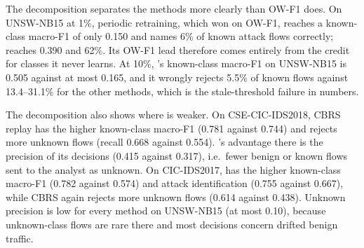 \begin{table}[t]
\centering
\caption{Open-world outcomes separated (mean over five seeds). Known: flows of classes the deployed model knows;
unknown: flows of classes it does not know.}
\label{tab:decomp}
\small
\setlength{\tabcolsep}{4pt}
%
%
\end{table}

The decomposition separates the methods more clearly than OW-F1 does. On UNSW-NB15 at 1\%, periodic retraining,
which won on OW-F1, reaches a known-class macro-F1 of only 0.150 and names 6\% of known attack flows correctly;
\nova{} reaches 0.390 and 62\%. Its OW-F1 lead therefore comes entirely from the \unk{} credit for classes it
never learns. At 10\%, \nova{}'s known-class macro-F1 on UNSW-NB15 is 0.505 against at most 0.165, and it wrongly
rejects 5.5\% of known flows against 13.4--31.1\% for the other methods, which is the stale-threshold failure in
numbers.

The decomposition also shows where \nova{} is weaker. On CSE-CIC-IDS2018, CBRS replay has the higher known-class
macro-F1 (0.781 against 0.744) and rejects more unknown flows (recall 0.668 against 0.554). \nova{}'s advantage there
is the precision of its \unk{} decisions (0.415 against 0.317), i.e.\ fewer benign or known flows sent to the
analyst as unknown. On CIC-IDS2017, \nova{} has the higher known-class macro-F1 (0.782 against 0.574) and attack
identification (0.755 against 0.667), while CBRS again rejects more unknown flows (0.614 against 0.438). Unknown
precision is low for every method on UNSW-NB15 (at most 0.10), because unknown-class flows are rare there and
most \unk{} decisions concern drifted benign traffic.

